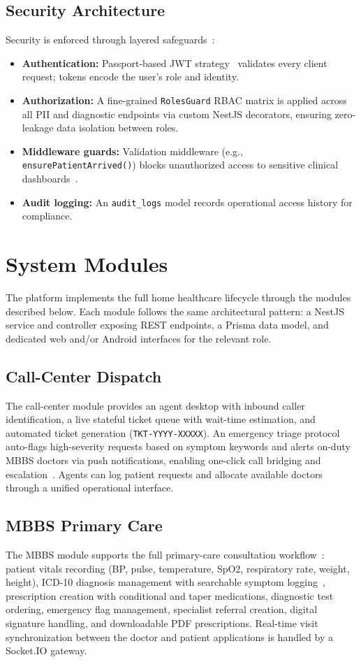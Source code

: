 \documentclass[conference]{IEEEtran}
\begin{document}
\subsection{Security Architecture}
Security is enforced through layered safeguards~\cite{jones2015jwt}:
\begin{itemize}
\item \textbf{Authentication:} Passport-based JWT strategy~\cite{jones2015jwt} validates every client request; tokens encode the user's role and identity.
\item \textbf{Authorization:} A fine-grained \texttt{RolesGuard} RBAC matrix is applied across all PII and diagnostic endpoints via custom NestJS decorators, ensuring zero-leakage data isolation between roles.
\item \textbf{Middleware guards:} Validation middleware (e.g., \texttt{ensurePatientArrived()}) blocks unauthorized access to sensitive clinical dashboards~\cite{androutsellis2004middleware}.
\item \textbf{Audit logging:} An \texttt{audit\_logs} model records operational access history for compliance.
\end{itemize}

\section{System Modules}

The platform implements the full home healthcare lifecycle through the modules described below. Each module follows the same architectural pattern: a NestJS service and controller exposing REST endpoints, a Prisma data model, and dedicated web and/or Android interfaces for the relevant role.

\subsection{Call-Center Dispatch}
The call-center module provides an agent desktop with inbound caller identification, a live stateful ticket queue with wait-time estimation, and automated ticket generation (\texttt{TKT-YYYY-XXXXX}). An emergency triage protocol auto-flags high-severity requests based on symptom keywords and alerts on-duty MBBS doctors via push notifications, enabling one-click call bridging and escalation~\cite{srs2026}. Agents can log patient requests and allocate available doctors through a unified operational interface.

\subsection{MBBS Primary Care}
The MBBS module supports the full primary-care consultation workflow~\cite{srs2026}: patient vitals recording (BP, pulse, temperature, SpO2, respiratory rate, weight, height), ICD-10 diagnosis management with searchable symptom logging~\cite{who2016icd10}, prescription creation with conditional and taper medications, diagnostic test ordering, emergency flag management, specialist referral creation, digital signature handling, and downloadable PDF prescriptions. Real-time visit synchronization between the doctor and patient applications is handled by a Socket.IO gateway.
\end{document}
